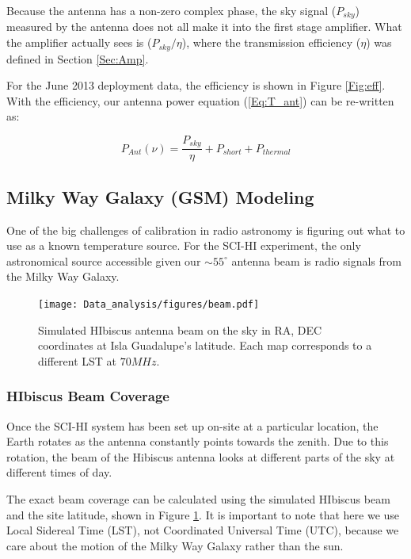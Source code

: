 Because the antenna has a non-zero complex phase, the sky signal ($P_{sky}$) measured by the antenna does not all make it into the first stage amplifier. What the amplifier actually sees is ($P_{sky}/\eta$), where the transmission efficiency ($\eta$) was defined in Section \ref{Sec:Amp}. 

For the June 2013 deployment data, the efficiency is shown in Figure \ref{Fig:eff}. With the efficiency, our antenna power equation (\ref{Eq:T_ant}) can be re-written as:

\begin{equation}
P_{Ant}(\nu) = \frac{P_{sky}}{\eta} + P_{short} +P_{thermal}
\end{equation}


\subsection{Milky Way Galaxy (GSM) Modeling} \label{Sec:model}

One of the big challenges of calibration in radio astronomy is figuring out what to use as a known temperature source. For the SCI-HI experiment, the only astronomical source accessible given our $\sim 55 ^\circ$ antenna beam is radio signals from the Milky Way Galaxy. 

\begin{figure}[htb]
\begin{center}
\texttt{[image: Data\_analysis/figures/beam.pdf]}
\caption{Simulated HIbiscus antenna beam on the sky in RA, DEC coordinates at Isla Guadalupe's latitude. Each map corresponds to a different LST at $70 MHz$. }
\label{Fig:HIbiscus_beam}
\end{center}
\end{figure}

\subsubsection{HIbiscus Beam Coverage}

Once the SCI-HI system has been set up on-site at a particular location, the Earth rotates as the antenna constantly points towards the zenith. Due to this rotation, the beam of the Hibiscus antenna looks at different parts of the sky at different times of day. 

The exact beam coverage can be calculated using the simulated HIbiscus beam and the site latitude, shown in Figure \ref{Fig:HIbiscus_beam}.  It is important to note that here we use Local Sidereal Time (LST), not Coordinated Universal Time (UTC), because we care about the motion of the Milky Way Galaxy rather than the sun.  

